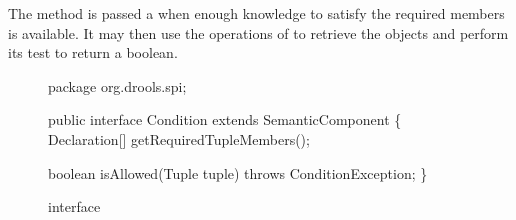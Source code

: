 The  method is passed a
 when enough knowledge to satisfy the required
members is available.  It may then use the operations of 
to retrieve the objects and perform its test to return a boolean.

\begin{figure}
\begin{javaCodelisting}
package org.drools.spi;

public interface Condition
    extends SemanticComponent
\{
    Declaration[] getRequiredTupleMembers();

    boolean isAllowed(Tuple tuple) throws ConditionException;
\}
\end{javaCodelisting}
\caption{ interface}
\label{condition}
\end{figure}

\subsubsection{}

\subsection{}

\subsubsection{}

\subsection{}

\subsubsection{}

\subsection{}

\subsubsection{}

